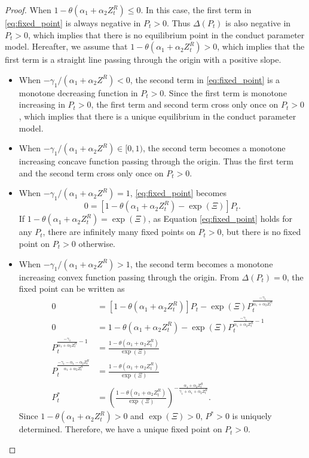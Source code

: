 \documentclass[11pt, a4paper]{article}
\begin{document}
\begin{proof}
    When $1 - \theta (\alpha_1 + \alpha_2 Z^{R}_{t}) \le 0$.
    In this case, the first term in \eqref{eq:fixed_point} is always negative in $P_t >0$.
    Thus $\Delta(P_t)$ is also negative in $P_t>0$, which implies that there is no equilibrium point in the conduct parameter model.
    Hereafter, we assume that $1 - \theta (\alpha_1 + \alpha_2 Z^{R}_{t}) >0$, which implies that the first term is a straight line passing through the origin with a positive slope. 
    \begin{itemize}
        \item When $-\gamma_1/(\alpha_1+\alpha_2 Z^R) < 0$, the second term in \eqref{eq:fixed_point} is a monotone decreasing function in $P_t >0$. Since the first term is monotone increasing in $P_t >0$, the first term and second term cross only once on $P_t >0$, which implies that there is a unique equilibrium in the conduct parameter model.
        \item When $-\gamma_1/(\alpha_1+\alpha_2 Z^R) \in [0, 1)$, the second term becomes a monotone increasing concave function passing through the origin. Thus the first term and the second term cross only once on $P_t >0$.
        \item When $-\gamma_1/(\alpha_1+\alpha_2 Z^R) = 1$, \eqref{eq:fixed_point} becomes
        \[ 0 = [1 - \theta (\alpha_1 + \alpha_2 Z^{R}_{t}) - \exp(\Xi)] P_t. \]
        If $ 1 - \theta (\alpha_1 + \alpha_2 Z^{R}_{t}) = \exp(\Xi)$, as Equation \eqref{eq:fixed_point}  holds for any $P_t$, there are infinitely many fixed points on $P_t >0$, but there is no fixed point on $P_t >0$ otherwise.
        \item When $-\gamma_1/(\alpha_1+\alpha_2 Z^R) > 1$, the second term becomes a monotone increasing convex function passing through the origin. From $\Delta (P_t) = 0$, the fixed point can be written as 
        \begin{align}
            0 & = [1-\theta(\alpha_1 + \alpha_2 Z^{R}_{t})]P_t - \exp(\Xi) P_t^{\frac{-\gamma_1}{\alpha_1 + \alpha_2 Z^{R}_{t}}}\nonumber \\ 
            0 & = 1-\theta(\alpha_1 + \alpha_2 Z^{R}_{t}) - \exp(\Xi)P_t^{\frac{-\gamma_1}{\alpha_1 + \alpha_2 Z^{R}_{t}}- 1} \nonumber\\ 
            P_t^{\frac{-\gamma_1}{\alpha_1 + \alpha_2 Z^{R}_{t}}- 1} & = \frac{1-\theta(\alpha_1 + \alpha_2 Z^{R}_{t})}{ \exp(\Xi)}\nonumber\\ 
            P_t^{\frac{-\gamma_1 - \alpha_1 - \alpha_2 Z^{R}_{t}}{\alpha_1 + \alpha_2 Z^{R}_{t}}}&= \frac{1-\theta(\alpha_1 + \alpha_2 Z^{R}_{t})}{ \exp(\Xi)}\nonumber\\
            P_t^* &= \left(\frac{1-\theta(\alpha_1 + \alpha_2 Z^{R}_{t})}{\exp(\Xi)}\right)^{-\frac{\alpha_1 + \alpha_2 Z^{R}_{t}}{\gamma_1 +\alpha_1 + \alpha_2 Z^{R}_{t}}}.
        \end{align} 
        Since $1 - \theta (\alpha_1 + \alpha_2 Z^{R}_{t}) >0$ and $\exp(\Xi)>0$, $P^* >0$ is uniquely determined. Therefore, we have a unique fixed point on $P_t >0$.
    \end{itemize}
\end{proof}
\end{document}
